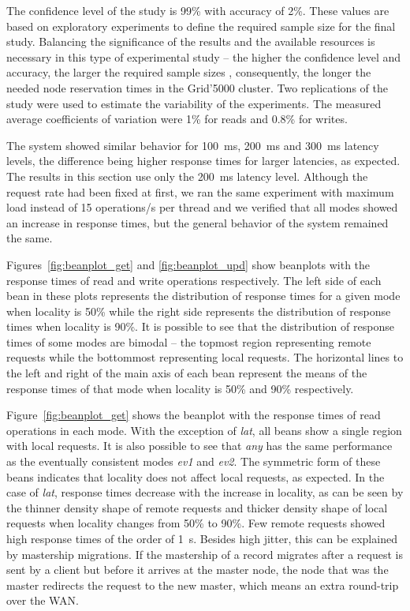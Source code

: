 \documentclass[man,floatsintext,12pt]{apa6}
\begin{document}
The confidence level of the study is 99\% with accuracy of 2\%. These values
are based on exploratory experiments to define the required sample size for the
final study. Balancing the significance of the results and the available
resources is necessary in this type of experimental study -- the higher the
confidence level and accuracy, the larger the required sample sizes
\parencite{Jain1991}, consequently, the longer the needed node reservation
times in the Grid'5000 cluster. Two replications of the study were used to
estimate the variability of the experiments. The measured average coefficients
of variation were 1\% for reads and 0.8\% for writes.

The system showed similar behavior for 100~ms, 200~ms and 300~ms latency
levels, the difference being higher response times for larger latencies, as
expected. The results in this section use only the 200~ms latency level.
Although the request rate had been fixed at first, we ran the same experiment
with maximum load instead of 15 operations/s per thread and we verified that
all modes showed an increase in response times, but the general behavior of the
system remained the same.

Figures~\ref{fig:beanplot_get} and \ref{fig:beanplot_upd} show beanplots
with the response times of read and write operations respectively. The left
side of each bean in these plots represents the distribution of response times
for a given mode when locality is 50\% while the right side represents the
distribution of response times when locality is 90\%. It is possible to see
that the distribution of response times of some modes are bimodal -- the
topmost region representing remote requests while the bottommost representing
local requests. The horizontal lines to the left and right of the main axis of
each bean represent the means of the response times of that mode when locality
is 50\% and 90\% respectively.

Figure~\ref{fig:beanplot_get} shows the beanplot with the response times of
read operations in each mode. With the exception of \textit{lat}, all beans
show a single region with local requests. It is also possible to see that
\textit{any} has the same performance as the eventually consistent modes
\textit{ev1} and \textit{ev2}. The symmetric form of these beans indicates that
locality does not affect local requests, as expected. In the case of
\textit{lat}, response times decrease with the increase in locality, as can be
seen by the thinner density shape of remote requests and thicker density shape
of local requests when locality changes from 50\% to 90\%. Few remote requests
showed high response times of the order of 1~s. Besides high jitter, this can be
explained by mastership migrations. If the mastership of a record migrates
after a request is sent by a client but before it arrives at the master node,
the node that was the master redirects the request to the new master, which
means an extra round-trip over the WAN.
\end{document}
